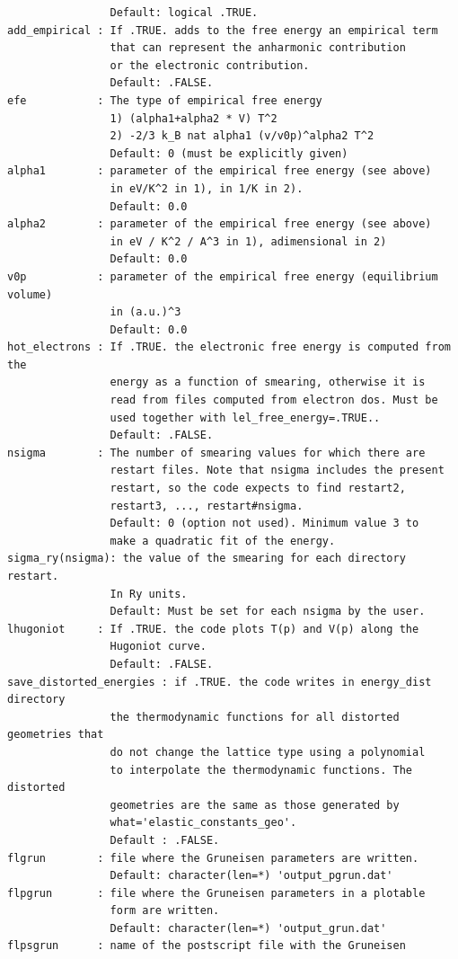\documentclass[12pt,a4paper,twoside]{report}
\begin{document}
\begin{verbatim}
                Default: logical .TRUE.
add_empirical : If .TRUE. adds to the free energy an empirical term
                that can represent the anharmonic contribution 
                or the electronic contribution.
                Default: .FALSE.
efe           : The type of empirical free energy
                1) (alpha1+alpha2 * V) T^2
                2) -2/3 k_B nat alpha1 (v/v0p)^alpha2 T^2
                Default: 0 (must be explicitly given)
alpha1        : parameter of the empirical free energy (see above)
                in eV/K^2 in 1), in 1/K in 2). 
                Default: 0.0
alpha2        : parameter of the empirical free energy (see above)
                in eV / K^2 / A^3 in 1), adimensional in 2)
                Default: 0.0
v0p           : parameter of the empirical free energy (equilibrium volume)
                in (a.u.)^3
                Default: 0.0
hot_electrons : If .TRUE. the electronic free energy is computed from the
                energy as a function of smearing, otherwise it is
                read from files computed from electron dos. Must be
                used together with lel_free_energy=.TRUE..
                Default: .FALSE.
nsigma        : The number of smearing values for which there are
                restart files. Note that nsigma includes the present
                restart, so the code expects to find restart2, 
                restart3, ..., restart#nsigma.
                Default: 0 (option not used). Minimum value 3 to
                make a quadratic fit of the energy.
sigma_ry(nsigma): the value of the smearing for each directory restart.
                In Ry units.
                Default: Must be set for each nsigma by the user.
lhugoniot     : If .TRUE. the code plots T(p) and V(p) along the 
                Hugoniot curve.
                Default: .FALSE.
save_distorted_energies : if .TRUE. the code writes in energy_dist directory
                the thermodynamic functions for all distorted geometries that 
                do not change the lattice type using a polynomial 
                to interpolate the thermodynamic functions. The distorted 
                geometries are the same as those generated by 
                what='elastic_constants_geo'.
                Default : .FALSE.
flgrun        : file where the Gruneisen parameters are written. 
                Default: character(len=*) 'output_pgrun.dat'
flpgrun       : file where the Gruneisen parameters in a plotable 
                form are written.
                Default: character(len=*) 'output_grun.dat'
flpsgrun      : name of the postscript file with the Gruneisen 

\end{verbatim}
\end{document}

